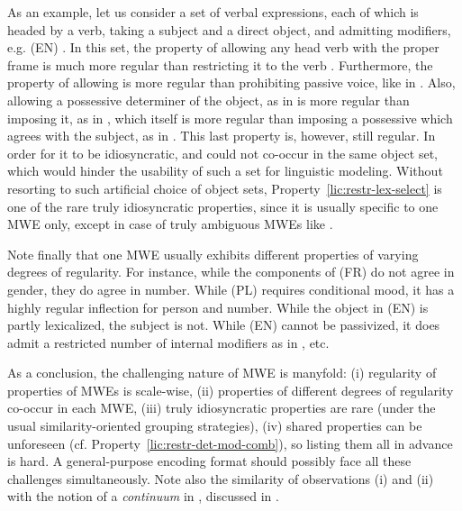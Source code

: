 \documentclass[output=paper
,modfonts
,nonflat
,biblatexbackend=biber
]{langsci/langscibook}
\begin{document}
As an example, let us consider a set of  verbal expressions, each of which is headed by a verb, taking a subject and a direct object, and admitting modifiers, e.g. (EN) . In this set, the property of allowing any head verb with the proper  frame is much more regular than restricting it to the verb . Furthermore, the property of allowing  is more regular than prohibiting passive voice, like in . Also, allowing a possessive determiner of the object, as in  is more regular than imposing it, as in , which itself is more regular than imposing a possessive which agrees with the subject, as in . This last property is, however, still regular. In order for it to be idiosyncratic,  and  could not co-occur in the same object set, which would hinder the usability of such a set for linguistic modeling. Without resorting to such artificial choice of object sets, Property~\ref{lic:restr-lex-select} is one of the rare truly idiosyncratic properties, since it is usually specific to one MWE only, except in case of truly ambiguous MWEs like .

Note finally that one MWE usually exhibits different properties of varying degrees of regularity. For instance, while the components of (FR)  do not agree in gender, they do agree in number. While (PL)  requires conditional mood, it has a highly regular inflection for person and number. While the object in (EN)  is partly lexicalized, the subject is not. While (EN)  cannot be passivized, it does admit a restricted number of internal modifiers as in , etc.

As a conclusion, the challenging nature of MWE is manyfold: (i) regularity of properties of MWEs is scale-wise, (ii) properties of different degrees of regularity co-occur in each MWE, (iii) truly idiosyncratic properties are rare (under the usual similarity-oriented grouping strategies), (iv) shared properties can be unforeseen (cf. Property~\ref{lic:restr-det-mod-comb}), so listing them all in advance is hard. A general-purpose encoding format should possibly face all these challenges simultaneously. Note also the similarity of observations (i) and (ii) with the notion of a \emph{ continuum} in , discussed in .
\end{document}
